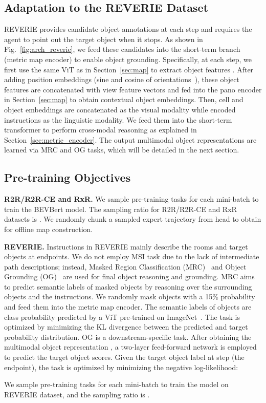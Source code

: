\subsection{Adaptation to the REVERIE Dataset}
REVERIE provides candidate object annotations at each step and requires the agent to point out the target object when it stops.
As shown in Fig.~\ref{fig:arch_reverie}, we feed these candidates into the short-term branch (metric map encoder) to enable object grounding. 
Specifically, at each step, we first use the same ViT as in Section~\ref{sec:map} to extract object features .
After adding position embeddings (sine and cosine of orientations~\cite{hong2021vln,chen2022think,lin2021scene}), these object features are concatenated with view feature vectors  and fed into the pano encoder in Section~\ref{sec:map} to obtain contextual object embeddings. 
Then, cell and object embeddings are concatenated as the visual modality while encoded instructions as the linguistic modality.
We feed them into the short-term transformer to perform cross-modal reasoning as explained in Section~\ref{sec:metric_encoder}.
The output multimodal object representations  are learned via MRC and OG tasks, which will be detailed in the next section.



\subsection{Pre-training Objectives}\label{sec:pretrain_reverie}
\noindent\textbf{R2R/R2R-CE and RxR.} We sample pre-training tasks for each mini-batch to train the BEVBert model. The sampling ratio for R2R/R2R-CE and RxR datasets is .
We randomly chunk a sampled expert trajectory  from head to obtain  for offline map construction. 



\vspace{1mm}
\noindent\textbf{REVERIE.} Instructions in REVERIE mainly describe the rooms and target objects at endpoints. 
We do not employ MSI task due to the lack of intermediate path descriptions; instead, Masked Region Classification (MRC)~\cite{lu2019vilbert} and Object Grounding (OG)~\cite{lin2021scene} are used for final object reasoning and grounding. 
MRC aims to predict semantic labels of masked objects by reasoning over the surrounding objects and the instructions. We randomly mask objects with a 15\% probability and feed them into the metric map encoder.
The semantic labels of objects are class probability predicted by a ViT pre-trained on ImageNet~\cite{deng2009imagenet}. The task is optimized by minimizing the KL divergence between the predicted and target probability distribution. 
OG is a downstream-specific task. After obtaining the multimodal object representation , a two-layer feed-forward network is employed to predict the target object scores. Given the target object label  at step  (the endpoint), the task is optimized by minimizing the negative log-likelihood:
{\small

}We sample pre-training tasks for each mini-batch to train the model on REVERIE dataset, and the sampling ratio is .

